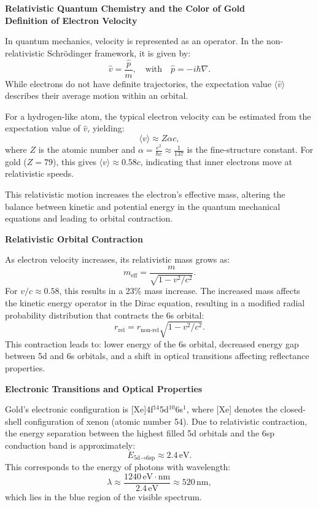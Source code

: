 \begin{technical}
\sloppy
{\Large\textbf{Relativistic Quantum Chemistry and the Color of Gold}}\\[0.7em]
\noindent\textbf{Definition of Electron Velocity}  

In quantum mechanics, velocity is represented as an operator. In the non-relativistic Schrödinger framework, it is given by:
\[
\hat{v} = \frac{\hat{p}}{m}, \quad \text{with} \quad \hat{p} = -i\hbar \nabla.
\]
While electrons do not have definite trajectories, the expectation value \(\langle \hat{v} \rangle\) describes their average motion within an orbital.

For a hydrogen-like atom, the typical electron velocity can be estimated from the expectation value of \(\hat{v}\), yielding:
\[
\langle v \rangle \approx Z\alpha c,
\]
where \(Z\) is the atomic number and \(\alpha = \frac{e^2}{\hbar c} \approx \frac{1}{137}\) is the fine-structure constant. For gold (\(Z = 79\)), this gives \(\langle v \rangle \approx 0.58c\), indicating that inner electrons move at relativistic speeds.

This relativistic motion increases the electron's effective mass, altering the balance between kinetic and potential energy in the quantum mechanical equations and leading to orbital contraction.

\noindent\textbf{Relativistic Orbital Contraction}  

As electron velocity increases, its relativistic mass grows as:
\[
m_\text{eff} = \frac{m}{\sqrt{1 - v^2/c^2}}.
\]
For \(v/c \approx 0.58\), this results in a 23\% mass increase. The increased mass affects the kinetic energy operator in the Dirac equation, resulting in a modified radial probability distribution that contracts the 6s orbital:
\[
r_\text{rel} = r_\text{non-rel} \sqrt{1 - v^2/c^2}.
\]
This contraction leads to: lower energy of the 6s orbital, decreased energy gap between 5d and 6s orbitals, and a shift in optical transitions affecting reflectance properties.


\noindent\textbf{Electronic Transitions and Optical Properties}  

Gold’s electronic configuration is [Xe]4f\(^{14}\)5d\(^{10}\)6s\(^{1}\), where [Xe] denotes the closed-shell configuration of xenon (atomic number 54). Due to relativistic contraction, the energy separation between the highest filled 5d orbitals and the 6sp conduction band is approximately:
\[
E_{\text{5d} \to \text{6sp}} \approx 2.4\, \text{eV}.
\]
This corresponds to the energy of photons with wavelength:
\[
\lambda \approx \frac{1240\,\text{eV}\cdot\text{nm}}{2.4\,\text{eV}} \approx 520\,\text{nm},
\]
which lies in the blue region of the visible spectrum.


\end{technical}
